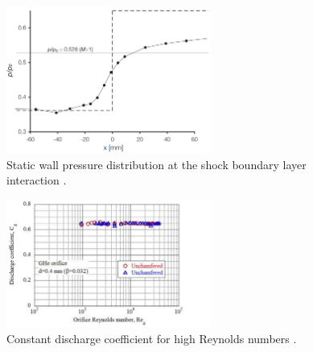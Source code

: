 \documentclass{article}
\begin{document}
\begin{figure}[H]
    \centering
    \includegraphics[width=0.6\textwidth]{SBLI_pressure_smearing.png}
    \caption{Static wall pressure distribution at the shock boundary layer interaction \cite{babinsky_delery:2011}.}
    \label{fig:SBLI_pressure_smearing}
\end{figure}

\begin{figure}[H]
    \centering
    \includegraphics[width=0.6\textwidth]{Graham_K_Webster_const_Cd_Re.png}
    \caption{Constant discharge coefficient for high Reynolds numbers \cite{Graham_K_Webster:2019}.}
    \label{fig:const_Cd_Re}
\end{figure}



\end{document}

